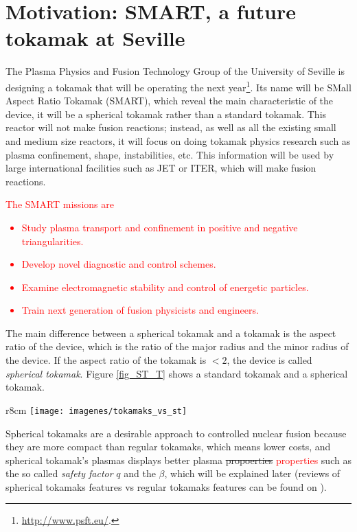 \documentclass[a4paper,12pt,oneside]{book}
\begin{document}
\section[Motivation: SMART]{Motivation: SMART, a future tokamak at Seville}
\label{sec_SMART_intro}
The Plasma Physics and Fusion Technology Group of the University of Seville is designing a tokamak that will be operating the next year\footnote{\url{http://www.psft.eu/}.}. Its name will be SMall Aspect Ratio Tokamak (SMART), which reveal the main characteristic of the device, it will be a spherical tokamak  rather than a standard tokamak. This reactor will not make fusion reactions; instead, as well as all the existing small and medium size reactors, it will focus on doing tokamak physics research such as plasma confinement, shape, instabilities, etc. This information will be used by large international facilities such as JET or ITER, which will make fusion reactions. \textcolor{red}{The SMART missions are
%
\begin{itemize}
\item Study plasma transport and confinement in positive and negative triangularities.
\item Develop novel diagnostic and control schemes.
\item Examine electromagnetic stability and control of energetic particles.
\item Train next generation of fusion physicists and engineers.
\end{itemize} }


The main difference between a spherical tokamak and a tokamak is the aspect ratio of the device, which is the ratio of the major radius and the minor radius of the device. If the aspect ratio of the tokamak is $< 2$, the device is called \textit{spherical tokamak}. Figure \ref{fig_ST_T} shows a standard tokamak and a spherical tokamak.

\begin{wrapfigure}{r}{8cm}
\texttt{[image: imagenes/tokamaks\_vs\_st]}
\caption{Tokamaks and spherical tokamaks. Source: \cite{ST_vs_T}.}
\label{fig_ST_T}
\end{wrapfigure}

Spherical tokamaks are a desirable approach to controlled nuclear fusion because they are more compact than regular tokamaks, which means lower costs, and spherical tokamak's plasmas displays better plasma \st{propoerties} \textcolor{red}{properties} such as the so called  \textit{safety factor} $q$ and the $\beta$, which will be explained later (reviews of spherical tokamaks features vs regular tokamaks features can be found on \cite{ST_vs_T,Peng_1986}).
\end{document}
